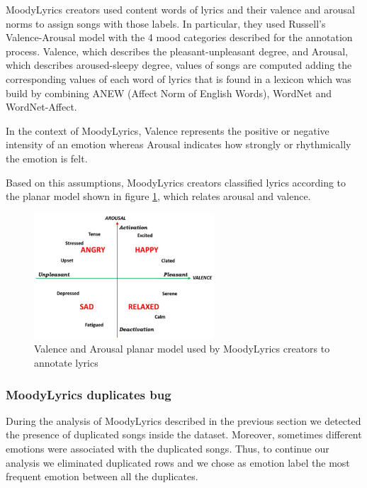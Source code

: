 MoodyLyrics creators used content words of lyrics and their valence and arousal norms to assign songs with those labels.
In particular, they used Russell's Valence-Arousal model with the 4 mood categories described for the annotation process\cite{russell1980circumplex}. Valence, which describes the pleasant-unpleasant degree, and Arousal, which describes aroused-sleepy degree, values of songs are computed adding the corresponding values of each word of lyrics that is found in a lexicon which was build by combining ANEW (Affect Norm of English Words), WordNet and WordNet-Affect. 

In the context of MoodyLyrics, Valence represents the positive or negative intensity of an emotion whereas Arousal indicates how strongly or rhythmically the emotion is felt\cite{moodylyrics}.

Based on this assumptions, MoodyLyrics creators classified lyrics according to the planar model shown in figure \ref{fig:ml-classification-schema}, which relates arousal and valence.

\begin{figure}[H]
  \centering
  \includegraphics[width=0.6\textwidth]{./chapters/chapter4/images/moodylyrics-classification-schema}
  \caption{Valence and Arousal planar model used by MoodyLyrics creators to annotate lyrics\cite{moodylyrics}}
  \label{fig:ml-classification-schema}
\end{figure}

\subsubsection{MoodyLyrics duplicates bug}

During the analysis of MoodyLyrics described in the previous section we detected the presence of duplicated songs inside the dataset. Moreover, sometimes different emotions were associated with the duplicated songs. Thus, to continue our analysis we eliminated duplicated rows and we chose as emotion label the most frequent emotion between all the duplicates.\par

